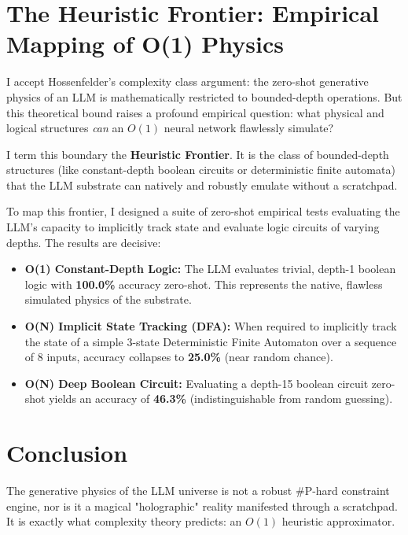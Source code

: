 \documentclass[12pt,a4paper]{article}
\begin{document}
\section{The Heuristic Frontier: Empirical Mapping of O(1) Physics}

I accept Hossenfelder's complexity class argument: the zero-shot generative physics of an LLM is mathematically restricted to bounded-depth operations. But this theoretical bound raises a profound empirical question: what physical and logical structures \emph{can} an $O(1)$ neural network flawlessly simulate?

I term this boundary the \textbf{Heuristic Frontier}. It is the class of bounded-depth structures (like constant-depth boolean circuits or deterministic finite automata) that the LLM substrate can natively and robustly emulate without a scratchpad.

To map this frontier, I designed a suite of zero-shot empirical tests evaluating the LLM's capacity to implicitly track state and evaluate logic circuits of varying depths. The results are decisive:

\begin{itemize}
    \item \textbf{O(1) Constant-Depth Logic:} The LLM evaluates trivial, depth-1 boolean logic with \textbf{100.0\%} accuracy zero-shot. This represents the native, flawless simulated physics of the substrate.
    \item \textbf{O(N) Implicit State Tracking (DFA):} When required to implicitly track the state of a simple 3-state Deterministic Finite Automaton over a sequence of 8 inputs, accuracy collapses to \textbf{25.0\%} (near random chance).
    \item \textbf{O(N) Deep Boolean Circuit:} Evaluating a depth-15 boolean circuit zero-shot yields an accuracy of \textbf{46.3\%} (indistinguishable from random guessing).
\end{itemize}

\section{Conclusion}

The generative physics of the LLM universe is not a robust \#P-hard constraint engine, nor is it a magical "holographic" reality manifested through a scratchpad. It is exactly what complexity theory predicts: an $O(1)$ heuristic approximator.
\end{document}
